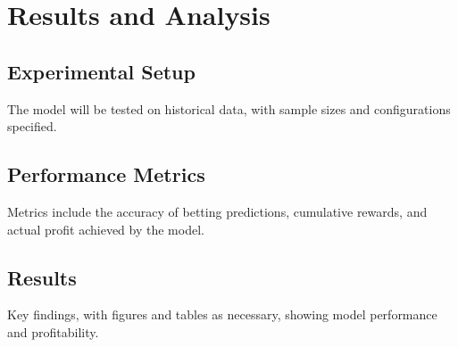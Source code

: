 \section{Results and Analysis}
    \subsection{Experimental Setup}
    The model will be tested on historical data, with sample sizes and configurations specified.

    \subsection{Performance Metrics}
    Metrics include the accuracy of betting predictions, cumulative rewards, and actual profit achieved by the model.

    \subsection{Results}
    Key findings, with figures and tables as necessary, showing model performance and profitability.